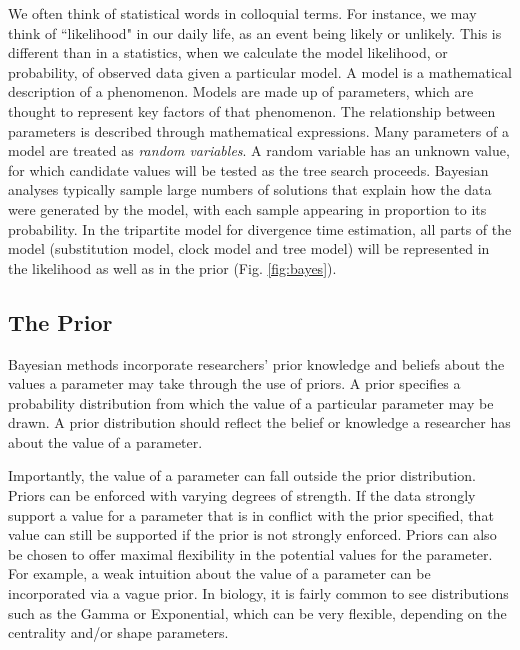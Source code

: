 We often think of statistical words in colloquial terms.
For instance, we may think of ``likelihood" in our daily life, as an event being likely or unlikely. 
This is different than in a statistics, when we calculate the model likelihood, or probability, of observed data given a particular model.
A model is a mathematical description of a phenomenon.
Models are made up of parameters, which are thought to represent key factors of that phenomenon.
The relationship between parameters is described through mathematical expressions.
Many parameters of a model are treated as \textit{random variables}.
A random variable has an unknown value, for which candidate values will be tested as the tree search proceeds. 
Bayesian analyses typically sample large numbers of solutions that explain how the data were generated by the model, with each sample appearing in proportion to its probability.
In the tripartite model for divergence time estimation, all parts of the model (substitution model, clock model and tree model) will be represented in the likelihood as well as in the prior (Fig. \ref{fig:bayes}).


\subsection{The Prior}


Bayesian methods incorporate researchers' prior knowledge and beliefs about the values a parameter may take through the use of priors.
A prior specifies a probability distribution from which the value of a particular parameter may be drawn.
A prior distribution should reflect the belief or knowledge a researcher has about the value of a parameter.

Importantly, the value of a parameter can fall outside the prior distribution.
Priors can be enforced with varying degrees of strength.
If the data strongly support a value for a parameter that is in conflict with the prior specified, that value can still be supported if the prior is not strongly enforced.
Priors can also be chosen to offer maximal flexibility in the potential values for the parameter.
For example, a weak intuition about the value of a parameter can be incorporated via a vague prior.
In biology, it is fairly common to see distributions such as the Gamma or Exponential, which can be very flexible, depending on the centrality and/or shape parameters.

